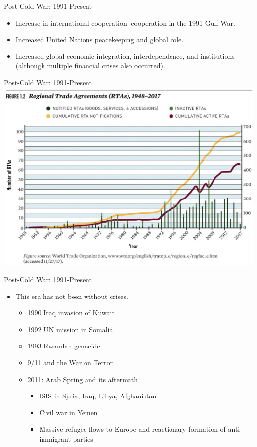 \documentclass{beamer}
\begin{document}
\begin{frame}{\LARGE Post-Cold War: 1991-Present}
	\begin{itemize}
		\item Increase in international cooperation: cooperation in the 1991 Gulf War.
		\item Increased United Nations peacekeeping and global role.
		\item Increased global economic integration, interdependence, and institutions (although multiple financial crises also occurred).
	\end{itemize}
\end{frame}

\begin{frame}{\LARGE Post-Cold War: 1991-Present}
\centering
\includegraphics[width=\textwidth,height=.9\textheight,keepaspectratio]{RTAs.jpg}
\end{frame}

\begin{frame}{\LARGE Post-Cold War: 1991-Present}
	\begin{itemize}
		\item This era has not been without crises.
		\begin{itemize}
			\item 1990 Iraq invasion of Kuwait
			\item 1992 UN mission in Somalia 
			\item 1993 Rwandan genocide
			\item 9/11 and the War on Terror
			\item 2011: Arab Spring and its aftermath
			\begin{itemize}
				\item ISIS in Syria, Iraq, Libya, Afghanistan
				\item Civil war in Yemen
				\item Massive refugee flows to Europe and reactionary formation of anti-immigrant parties
			\end{itemize}	
		\end{itemize}
	\end{itemize}
\end{frame}
\end{document}
